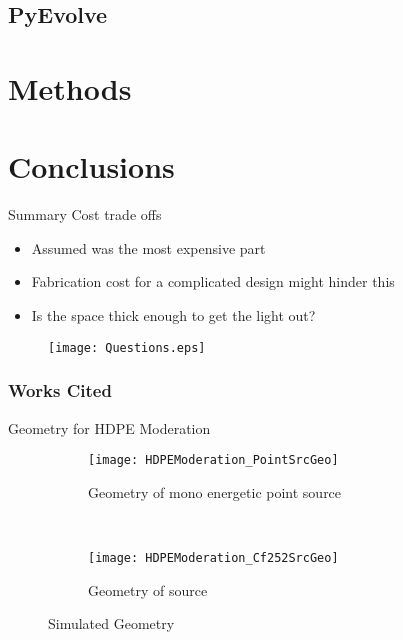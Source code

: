\documentclass[compress]{beamer}
\begin{document}
\subsection{PyEvolve}

\section{Methods}

\section{Conclusions}
\begin{frame}{Summary}
Cost trade offs
\begin{itemize}
	\item Assumed  was the most expensive part
	\item Fabrication cost for a complicated design might hinder this
	\item Is the space thick enough to get the light out?
\end{itemize}
\begin{figure}
	\centering
  \texttt{[image: Questions.eps]}
\end{figure}
\end{frame}

\begin{frame}
\frametitle{Works Cited}
	\tiny
  
\end{frame}

\begin{frame}{Geometry for HDPE Moderation}
\begin{figure}
  \begin{subfigure}[b]{0.45\textwidth}
    \centering
    \texttt{[image: HDPEModeration\_PointSrcGeo]}
    \caption{Geometry of mono energetic point source}
  \end{subfigure}%
  ~
  \begin{subfigure}[b]{0.45\textwidth}
    \centering
    \texttt{[image: HDPEModeration\_Cf252SrcGeo]}
    \caption{Geometry of  source}
  \end{subfigure}
  \caption{Simulated Geometry}
\end{figure}
\end{frame}
\end{document}
